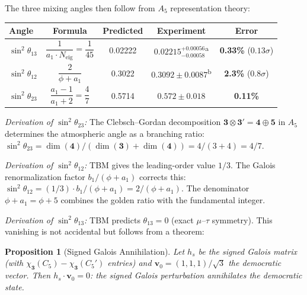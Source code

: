 \documentclass[12pt,a4paper]{article}
\newtheorem{proposition}{Proposition}
\theoremstyle{definition}
\begin{document}
The three mixing angles then follow from $A_5$ representation theory:

\begin{center}
\begin{tabular}{lcccc}
\toprule
\textbf{Angle} & \textbf{Formula} & \textbf{Predicted} & \textbf{Experiment} & \textbf{Error} \\
\midrule
$\sin^2\theta_{13}$ & $\dfrac{1}{a_1 \cdot N_{\text{eig}}} = \dfrac{1}{45}$ & 0.02222 & $0.02215^{+0.00056}_{-0.00058}$\textsuperscript{a} & \textbf{0.33\%} ($0.13\sigma$) \\[8pt]
$\sin^2\theta_{12}$ & $\dfrac{2}{\phi + a_1}$ & 0.3022 & $0.3092 \pm 0.0087$\textsuperscript{b} & \textbf{2.3\%} ($0.8\sigma$) \\[8pt]
$\sin^2\theta_{23}$ & $\dfrac{a_1 - 1}{a_1 + 2} = \dfrac{4}{7}$ & 0.5714 & $0.572 \pm 0.018$ & \textbf{0.11\%} \\
\bottomrule
\end{tabular}
\end{center}

\noindent\textit{Derivation of $\sin^2\theta_{23}$:} The Clebsch--Gordan decomposition $\mathbf{3} \otimes \mathbf{3'} = \mathbf{4} \oplus \mathbf{5}$ in $A_5$ determines the atmospheric angle as a branching ratio: $\sin^2\theta_{23} = \dim(\mathbf{4})/(\dim(\mathbf{3}) + \dim(\mathbf{4})) = 4/(3+4) = 4/7$.

\noindent\textit{Derivation of $\sin^2\theta_{12}$:} TBM gives the leading-order value $1/3$.  The Galois renormalization factor $b_1/(\phi + a_1)$ corrects this: $\sin^2\theta_{12} = (1/3) \cdot b_1/(\phi + a_1) = 2/(\phi + a_1)$.  The denominator $\phi + a_1 = \phi + 5$ combines the golden ratio with the fundamental integer.

\noindent\textit{Derivation of $\sin^2\theta_{13}$:} TBM predicts $\theta_{13} = 0$ (exact $\mu$--$\tau$ symmetry).  This vanishing is not accidental but follows from a theorem:

\begin{proposition}[Signed Galois Annihilation]
Let $h_s$ be the signed Galois matrix (with $\chi_{\mathbf{3}}(C_5) - \chi_{\mathbf{3}}(C_5')$ entries) and $\mathbf{v}_0 = (1,1,1)/\sqrt{3}$ the democratic vector.  Then $h_s \cdot \mathbf{v}_0 = 0$: the signed Galois perturbation annihilates the democratic state.
\end{proposition}
\end{document}
